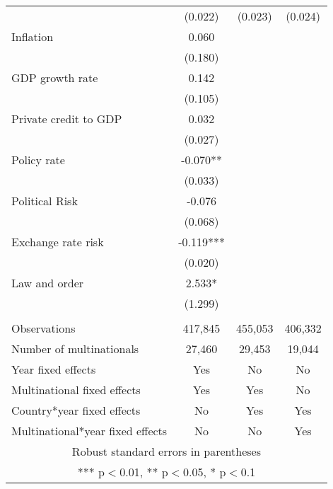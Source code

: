 \begin{tabular}{lccc}
 & (0.022) & (0.023) & (0.024) \\
Inflation & 0.060 &  &  \\
 & (0.180) &  &  \\
GDP growth rate & 0.142 &  &  \\
 & (0.105) &  &  \\
Private credit to GDP & 0.032 &  &  \\
 & (0.027) &  &  \\
Policy rate & -0.070** &  &  \\
 & (0.033) &  &  \\
Political Risk & -0.076 &  &  \\
 & (0.068) &  &  \\
Exchange rate risk & -0.119*** &  &  \\
 & (0.020) &  &  \\
Law and order & 2.533* &  &  \\
 & (1.299) &  &  \\
 &  &  &  \\
Observations & 417,845 & 455,053 & 406,332 \\
Number of multinationals & 27,460 & 29,453 & 19,044 \\
Year fixed effects & Yes & No & No \\
Multinational fixed effects & Yes & Yes & No \\
Country*year fixed effects & No & Yes & Yes \\
 Multinational*year fixed effects & No & No & Yes \\ \hline
\multicolumn{4}{c}{ Robust standard errors in parentheses} \\
\multicolumn{4}{c}{ *** p$<$0.01, ** p$<$0.05, * p$<$0.1} \\
\end{tabular}
